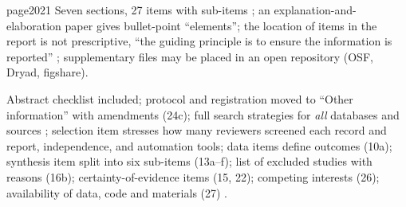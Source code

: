 \begin{papercard}{page2021}
 Seven sections, 27 items with sub-items ; an explanation-and-elaboration paper gives bullet-point ``elements''; the location of items in the report is not prescriptive, ``the guiding principle is to ensure the information is reported'' ; supplementary files may be placed in an open repository (OSF, Dryad, figshare).

 Abstract checklist included; protocol and registration moved to ``Other information'' with amendments (24c); full search strategies for \emph{all} databases and sources ; selection item stresses how many reviewers screened each record and report, independence, and automation tools; data items define outcomes (10a); synthesis item split into six sub-items (13a--f); list of excluded studies with reasons (16b); certainty-of-evidence items (15, 22); competing interests (26); availability of data, code and materials (27) .


\end{papercard}
